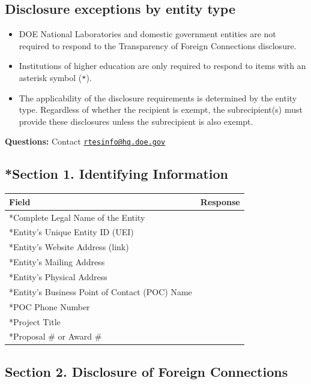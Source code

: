 \documentclass[
]{article}
\providecommand{\tightlist}{%
  \setlength{\itemsep}{0pt}\setlength{\parskip}{0pt}}
\begin{document}
\subsection{Disclosure exceptions by entity
type}\label{disclosure-exceptions-by-entity-type}

\begin{itemize}
\tightlist
\item
  DOE National Laboratories and domestic government entities are not
  required to respond to the Transparency of Foreign Connections
  disclosure.
\item
  Institutions of higher education are only required to respond to items
  with an asterisk symbol (\texttt{*}).
\item
  The applicability of the disclosure requirements is determined by the
  entity type. Regardless of whether the recipient is exempt, the
  subrecipient(s) must provide these disclosures unless the subrecipient
  is also exempt.
\end{itemize}

\textbf{Questions:} Contact
\href{mailto:rtesinfo@hq.doe.gov}{\nolinkurl{rtesinfo@hq.doe.gov}}

\subsection{*Section 1. Identifying
Information}\label{section-1-identifying-information}

\begin{longtable}[]{@{}ll@{}}
\toprule\noalign{}
Field & Response \\
\midrule\noalign{}
\endhead
\bottomrule\noalign{}
\endlastfoot
*Complete Legal Name of the Entity & \\
*Entity's Unique Entity ID (UEI) & \\
*Entity's Website Address (link) & \\
*Entity's Mailing Address & \\
*Entity's Physical Address & \\
*Entity's Business Point of Contact (POC) Name & \\
*POC Phone Number & \\
*Project Title & \\
*Proposal \# or Award \# & \\
\end{longtable}

\subsection{Section 2. Disclosure of Foreign
Connections}\label{section-2-disclosure-of-foreign-connections}
\end{document}
